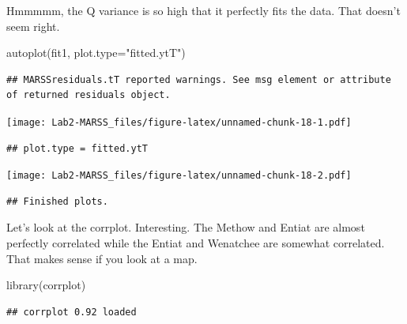 \documentclass[
]{article}
\newenvironment{Shaded}{\begin{snugshade}}{\end{snugshade}}
\newcommand{\AttributeTok}[1]{\textcolor[rgb]{0.77,0.63,0.00}{#1}}
\newcommand{\DecValTok}[1]{\textcolor[rgb]{0.00,0.00,0.81}{#1}}
\newcommand{\FunctionTok}[1]{\textcolor[rgb]{0.00,0.00,0.00}{#1}}
\newcommand{\NormalTok}[1]{#1}
\newcommand{\OtherTok}[1]{\textcolor[rgb]{0.56,0.35,0.01}{#1}}
\newcommand{\SpecialCharTok}[1]{\textcolor[rgb]{0.00,0.00,0.00}{#1}}
\newcommand{\StringTok}[1]{\textcolor[rgb]{0.31,0.60,0.02}{#1}}
\begin{document}
Hmmmmm, the Q variance is so high that it perfectly fits the data. That
doesn't seem right.

\begin{Shaded}
\begin{Highlighting}[]
\FunctionTok{autoplot}\NormalTok{(fit1, }\AttributeTok{plot.type=}\StringTok{"fitted.ytT"}\NormalTok{)}
\end{Highlighting}
\end{Shaded}

\begin{verbatim}
## MARSSresiduals.tT reported warnings. See msg element or attribute of returned residuals object.
\end{verbatim}

\texttt{[image: Lab2-MARSS\_files/figure-latex/unnamed-chunk-18-1.pdf]}

\begin{verbatim}
## plot.type = fitted.ytT
\end{verbatim}

\texttt{[image: Lab2-MARSS\_files/figure-latex/unnamed-chunk-18-2.pdf]}

\begin{verbatim}
## Finished plots.
\end{verbatim}

Let's look at the corrplot. Interesting. The Methow and Entiat are
almost perfectly correlated while the Entiat and Wenatchee are somewhat
correlated. That makes sense if you look at a map.

\begin{Shaded}
\begin{Highlighting}[]
\FunctionTok{library}\NormalTok{(corrplot)}
\end{Highlighting}
\end{Shaded}

\begin{verbatim}
## corrplot 0.92 loaded
\end{verbatim}

\begin{Shaded}
\end{Shaded}
\end{document}
